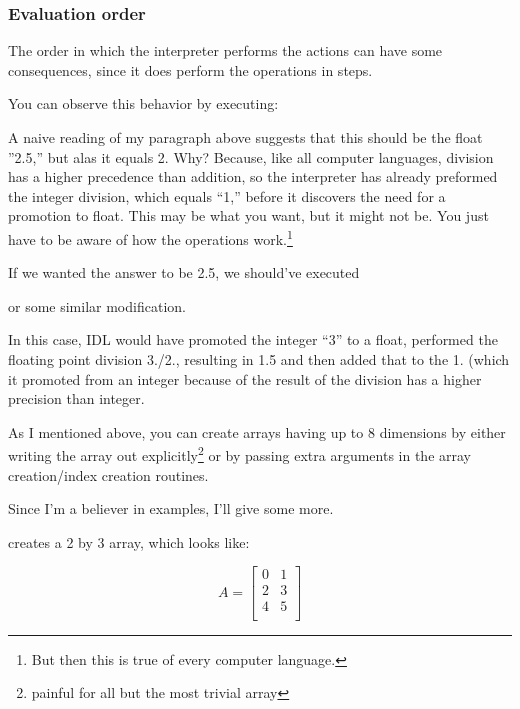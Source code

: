 \subsubsection{Evaluation order}\label{qs-evaluation-order}
  The order in which the interpreter performs the actions can have
  some consequences, since it does perform the operations in
  steps. 

  You can observe this behavior by executing:


  A naive reading of my paragraph above suggests that this should be the
  float ''2.5,'' but alas it equals 2. Why? Because, like all computer
  languages, division has a higher precedence than addition, so the
  interpreter has already preformed the integer division, which equals
  ``1,'' before it discovers the need for a promotion to float. This may
  be what you want, but it might not be. You just have to be aware of
  how the operations work.\footnote{But then this is true of every
  computer language.}

  If we wanted the answer to be 2.5, we should've executed 


  or some similar modification.

  In this case, IDL would have promoted the integer ``3'' to a float,
  performed the floating point division 3./2., resulting in 1.5 and then
  added that to the 1. (which it promoted from an integer because of the
  result of the division has a higher precision than integer.

  As I mentioned above, you can create arrays having up to 8
  dimensions by either writing the array out
  explicitly\footnote{painful for all but the most trivial array} or
  by passing extra arguments in the array creation/index creation
  routines.

  Since I'm a believer in examples, I'll give some more.

  
  creates a 2 by 3 array, which looks like:

        \[ A = \left[ \begin{array}{ccc}
            0 & 1\\
            2 & 3\\
            4 & 5\\
        \end{array} \right] \]


